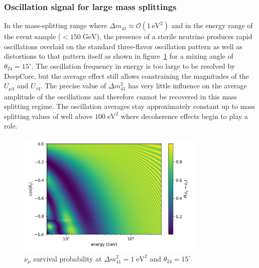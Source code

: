 \subsubsection{Oscillation signal for large mass splittings}
In the mass-splitting range where $\Delta m_{41}\approx\mathcal{O}(1\,\mathrm{eV^2})$ and in the energy range of the event sample ($<150\;\mathrm{GeV}$), the presence of a sterile neutrino produces rapid oscillations overlaid on the standard three-flavor oscillation pattern as well as distortions to that pattern itself as shown in figure~\ref{fig:numu_survival_1eV2_analysis_binning_range} for a mixing angle of $\theta_{24}=15^\circ$. The oscillation frequency in energy is too large to be resolved by DeepCore, but the average effect still allows constraining the magnitudes of the $U_{\mu4}$ and $U_{\tau4}$. The precise value of $\Delta m^2_{41}$ has very little influence on the average amplitude of the oscillations and therefore cannot be recovered in this mass splitting regime. The oscillation averages stay approximately constant up to mass splitting values of well above $100\;\mathrm{eV^2}$ where decoherence effects begin to play a role\cite{atmo_decoherence}.
\begin{figure}
    \centering
    \includegraphics[width=0.8\textwidth]{figures/measurement/sterile_analysis/physics/dm41_1.0eV2_th24_15deg_avg_height_10-30km_ana_binning_range.png}
    \caption{$\nu_{\mu}$ survival probability at $\Delta m^2_{41}=1\;\mathrm{eV^2}$ and $\theta_{24}=15^\circ$}
    \label{fig:numu_survival_1eV2_analysis_binning_range}
\end{figure}

